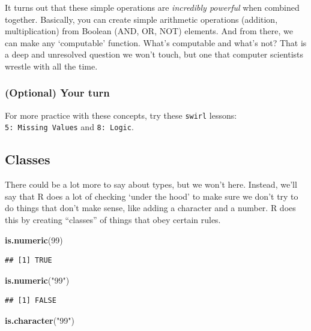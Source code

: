 \documentclass[]{article}
\newenvironment{Shaded}{\begin{snugshade}}{\end{snugshade}}
\newcommand{\KeywordTok}[1]{\textcolor[rgb]{0.13,0.29,0.53}{\textbf{#1}}}
\newcommand{\DecValTok}[1]{\textcolor[rgb]{0.00,0.00,0.81}{#1}}
\newcommand{\StringTok}[1]{\textcolor[rgb]{0.31,0.60,0.02}{#1}}
\newcommand{\NormalTok}[1]{#1}
\begin{document}
It turns out that these simple operations are \emph{incredibly powerful}
when combined together. Basically, you can create simple arithmetic
operations (addition, multiplication) from Boolean (AND, OR, NOT)
elements. And from there, we can make any `computable' function. What's
computable and what's not? That is a deep and unresolved question we
won't touch, but one that computer scientists wrestle with all the time.

\subsubsection{(Optional) Your turn}\label{optional-your-turn}

For more practice with these concepts, try these \texttt{swirl} lessons:
\texttt{5:\ Missing\ Values} and \texttt{8:\ Logic}.

\subsection{Classes}\label{classes}

There could be a lot more to say about types, but we won't here.
Instead, we'll say that R does a lot of checking `under the hood' to
make sure we don't try to do things that don't make sense, like adding a
character and a number. R does this by creating ``classes'' of things
that obey certain rules.

\begin{Shaded}
\begin{Highlighting}[]
\KeywordTok{is.numeric}\NormalTok{(}\DecValTok{99}\NormalTok{)}
\end{Highlighting}
\end{Shaded}

\begin{verbatim}
## [1] TRUE
\end{verbatim}

\begin{Shaded}
\begin{Highlighting}[]
\KeywordTok{is.numeric}\NormalTok{(}\StringTok{"99"}\NormalTok{)}
\end{Highlighting}
\end{Shaded}

\begin{verbatim}
## [1] FALSE
\end{verbatim}

\begin{Shaded}
\begin{Highlighting}[]
\KeywordTok{is.character}\NormalTok{(}\StringTok{"99"}\NormalTok{)}
\end{Highlighting}
\end{Shaded}
\end{document}
